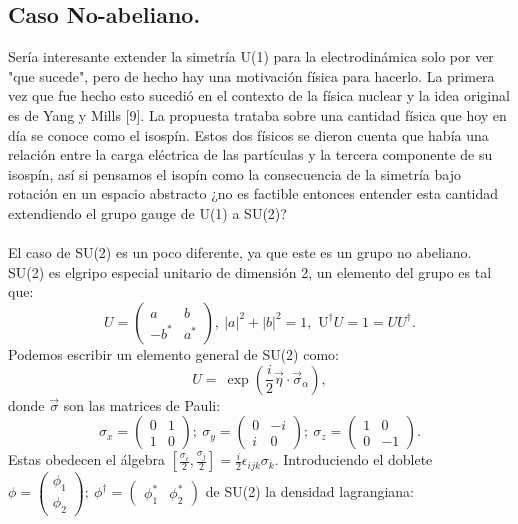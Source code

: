 \subsection{Caso No-abeliano.}
Sería interesante extender la simetría U(1) para la electrodinámica solo por ver "que sucede", pero de hecho hay una motivación física para hacerlo. La primera vez que fue hecho esto sucedió en el contexto de la física nuclear y la idea original es de Yang y Mills [9]. La propuesta trataba sobre una cantidad física que hoy en día se conoce como el isospín. Estos dos físicos se dieron cuenta que había una relación entre la carga eléctrica de las partículas y la tercera componente de su isospín, así si pensamos el isopín como la consecuencia de la simetría bajo rotación en un espacio abstracto ¿no es factible entonces entender esta cantidad extendiendo el grupo gauge de U(1) a SU(2)?
\\
\\
El caso de SU(2) es un poco diferente, ya que este es un grupo no abeliano. SU(2) es elgripo especial unitario de dimensión 2, un elemento del grupo es tal que: 
\begin{equation}
U=\left(\begin{array}{cc}
a & b\\
-b^{*} & a^{*}
\end{array}\right),\ |a|^{2}+|b|^{2}=1,\text{\ U}^{\dagger}U=1=UU^{\dagger}.
\end{equation}
Podemos escribir un elemento general de SU(2) como: 
\begin{equation}
U=\ \exp\left(\frac{i}{2}\vec{\eta}\cdot\vec{\sigma}_\alpha\right),
\end{equation}
donde $\vec{\sigma}$ son las matrices de Pauli:
\begin{equation}
\sigma_{x}=\left(\begin{array}{cc}
0 & 1\\
1 & 0
\end{array}\right);\ \sigma_{y}=\left(\begin{array}{cc}
0 & -i\\
i & 0
\end{array}\right);\ \sigma_{z}=\left(\begin{array}{cc}
1 & 0\\
0 & -1
\end{array}\right) .
\end{equation}
Estas obedecen el álgebra $[\frac{\sigma_i}{2},\frac{\sigma_j}{2}]=\frac{i}{2}\epsilon_{ijk}\sigma_k$.
Introduciendo el doblete $\phi=\left(\begin{array}{c}
\phi_{1}\\
\phi_{2}
\end{array}\right);\ \phi^{\dagger}=\left(\begin{array}{cc}
\phi_{1}^{*} & \phi_{2}^{*}\end{array}\right)$ de SU(2) la densidad lagrangiana:

